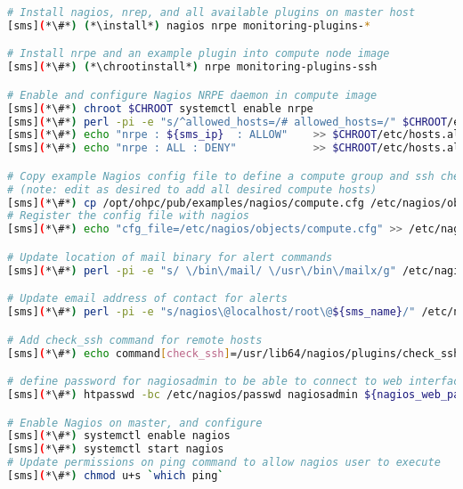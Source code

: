 \begin{lstlisting}[language=bash,keywords={},upquote=true]
# Install nagios, nrep, and all available plugins on master host
[sms](*\#*) (*\install*) nagios nrpe monitoring-plugins-*

# Install nrpe and an example plugin into compute node image
[sms](*\#*) (*\chrootinstall*) nrpe monitoring-plugins-ssh

# Enable and configure Nagios NRPE daemon in compute image 
[sms](*\#*) chroot $CHROOT systemctl enable nrpe
[sms](*\#*) perl -pi -e "s/^allowed_hosts=/# allowed_hosts=/" $CHROOT/etc/nagios/nrpe.cfg
[sms](*\#*) echo "nrpe : ${sms_ip}  : ALLOW"    >> $CHROOT/etc/hosts.allow
[sms](*\#*) echo "nrpe : ALL : DENY"            >> $CHROOT/etc/hosts.allow

# Copy example Nagios config file to define a compute group and ssh check
# (note: edit as desired to add all desired compute hosts)
[sms](*\#*) cp /opt/ohpc/pub/examples/nagios/compute.cfg /etc/nagios/objects
# Register the config file with nagios
[sms](*\#*) echo "cfg_file=/etc/nagios/objects/compute.cfg" >> /etc/nagios/nagios.cfg

# Update location of mail binary for alert commands
[sms](*\#*) perl -pi -e "s/ \/bin\/mail/ \/usr\/bin\/mailx/g" /etc/nagios/objects/commands.cfg

# Update email address of contact for alerts
[sms](*\#*) perl -pi -e "s/nagios\@localhost/root\@${sms_name}/" /etc/nagios/objects/contacts.cfg

# Add check_ssh command for remote hosts
[sms](*\#*) echo command[check_ssh]=/usr/lib64/nagios/plugins/check_ssh localhost $CHROOT/etc/nagios/nrpe.cfg

# define password for nagiosadmin to be able to connect to web interface
[sms](*\#*) htpasswd -bc /etc/nagios/passwd nagiosadmin ${nagios_web_password}

# Enable Nagios on master, and configure
[sms](*\#*) systemctl enable nagios
[sms](*\#*) systemctl start nagios
# Update permissions on ping command to allow nagios user to execute
[sms](*\#*) chmod u+s `which ping`
\end{lstlisting}

